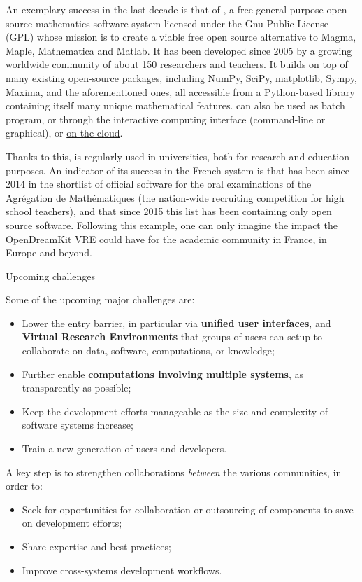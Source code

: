 \documentclass[12pt]{amsart}
\makeatletter
\def\subsection{\@startsection{subsection}{2}%
  \z@{.3\linespacing\@plus.5\linespacing}{.1\linespacing}%
  {\normalfont\bfseries}}
\makeatother
\begin{document}
An exemplary success in the last decade is that of \Sage,
a free general purpose open-source mathematics
software system licensed under the Gnu Public License (GPL) whose mission is to create a
viable free open source alternative to Magma, Maple, Mathematica and
Matlab. It has been developed since 2005 by a growing worldwide community of
about 150 researchers and teachers. It builds on top of many existing
open-source packages, including NumPy, SciPy, matplotlib, Sympy,
Maxima, and the aforementioned ones, all accessible from a
Python-based library containing itself many unique mathematical
features. \Sage can also be used as batch program, or through the
\Jupyter interactive computing interface (command-line or graphical),
or \href{cloud.sagemath.org}{on the cloud}.

Thanks to this, \Sage is regularly used in universities, both for
research and education purposes.  An indicator of its success in the French
system is that \Sage has been since 2014 in the shortlist of official
software for the oral examinations of the Agrégation de Mathématiques
(the nation-wide recruiting competition for high school teachers), and
that since 2015 this list has been containing only open source software.
Following this example, one can only imagine the impact the
OpenDreamKit VRE could have for the academic community in France,
in Europe and beyond.

\subsection{Upcoming challenges}

Some of the upcoming major challenges are:
\begin{itemize}
\item Lower the entry barrier, in particular via \textbf{unified user
    interfaces}, and \textbf{Virtual Research Environments} that
  groups of users can setup to collaborate on data, software,
  computations, or knowledge;
\item Further enable \textbf{computations involving multiple systems},
  as transparently as possible;
\item Keep the development efforts manageable as the size and
  complexity of software systems increase;
\item Train a new generation of users and developers.
\end{itemize}

A key step is to strengthen collaborations \emph{between} the various
communities, in order to:
\begin{itemize}
\item Seek for opportunities for collaboration or outsourcing of
  components to save on development efforts;
\item Share expertise and best practices;
\item Improve cross-systems development workflows.
\end{itemize}
\end{document}

